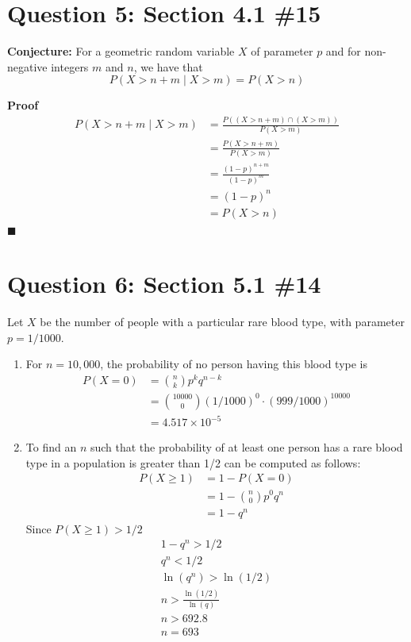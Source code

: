 \documentclass[11pt, oneside]{article}   	%
\newcommand*{\QEDA}{\hfill\ensuremath{\blacksquare}}         %
\begin{document}
\section*{Question 5: Section 4.1 \#15}

\textbf{Conjecture:} For a geometric random variable $X$ of parameter $p$ and for non-negative integers $m$ and $n$, we have that
	$$P(X > n+m \mid X > m) = P(X > n)$$
	
\textbf{Proof}
	\begin{align*}
		P(X > n+m \mid X > m) & = \frac{P((X > n+ m) \cap (X > m))}{P(X > m)} \\
		& = \frac{P(X > n+ m)}{P(X > m)} \\
		& = \frac{(1-p)^{n+m}}{(1-p)^m} \\
		& = (1-p)^n \\
		& = P(X > n)
	\end{align*}
	\QEDA
	
\section*{Question 6: Section 5.1 \#14}

Let $X$ be the number of people with a particular rare blood type, with parameter $p= 1/1000$.

\begin{enumerate}[\quad (a)]
	\item For $n=10,000$, the probability of no person having this blood type is
		\begin{align*}
			P(X=0) & = {n \choose k} p^k q^{n-k} \\
			& = {10000 \choose 0} (1/1000)^0 \cdot (999/1000)^{10000} \\
			& = 4.517 \times 10^{-5}
		\end{align*}
	\item To find an $n$ such that the probability of at least one person has a rare blood type in a population is greater than 1/2 can be computed as follows:
		\begin{align*}
			P(X\geq 1) & = 1 - P(X=0)\\
			& = 1- {n \choose 0} p^0 q^{n} \\
			& = 1 - q^n
		\end{align*}
	Since $P(X \geq 1) > 1/2$
		\begin{align*}
			1 - q^n > 1/2 \\
			q^n < 1/2 \\
			\ln(q^n)> \ln(1/2) \\
			n > \frac{\ln(1/2)}{\ln(q)} \\
			n > 692.8 \\
			n = 693
		\end{align*}
\end{enumerate}
\end{document}
